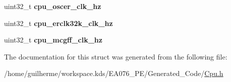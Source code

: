 \begin{DoxyCompactItemize}
uint32\+\_\+t {\bfseries cpu\+\_\+oscer\+\_\+clk\+\_\+hz}
\item 
\mbox{\label{struct_t_cpu_clock_configuration_a3f68e3893f7dec551e938a909929687b}} 
uint32\+\_\+t {\bfseries cpu\+\_\+erclk32k\+\_\+clk\+\_\+hz}
\item 
\mbox{\label{struct_t_cpu_clock_configuration_a5bd9b1235d0f85073ed01c126782d898}} 
uint32\+\_\+t {\bfseries cpu\+\_\+mcgff\+\_\+clk\+\_\+hz}
\end{DoxyCompactItemize}


The documentation for this struct was generated from the following file\+:\begin{DoxyCompactItemize}
\item 
/home/guilherme/workspace.\+kds/\+E\+A076\+\_\+\+P\+E/\+Generated\+\_\+\+Code/\hyperlink{_cpu_8h}{Cpu.\+h}\end{DoxyCompactItemize}
